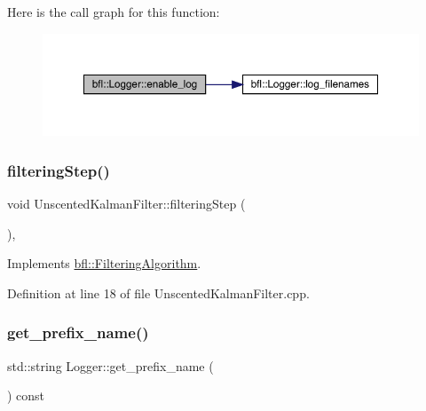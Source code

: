 Here is the call graph for this function\+:
\nopagebreak
\begin{figure}[H]
\begin{center}
\leavevmode
\includegraphics[width=350pt]{classbfl_1_1Logger_ae94b97b6e8d7902e8ce048384813122e_cgraph}
\end{center}
\end{figure}
\mbox{\label{classbfl_1_1UnscentedKalmanFilter_a169451bb711a03ad2dc28a40e3ad867f}} 
\subsubsection{\texorpdfstring{filtering\+Step()}{filteringStep()}}
{\footnotesize\ttfamily void Unscented\+Kalman\+Filter\+::filtering\+Step (\begin{DoxyParamCaption}{ }\end{DoxyParamCaption})\hspace{0.3cm}{\ttfamily [override]}, {\ttfamily [virtual]}}



Implements \mbox{\hyperlink{classbfl_1_1FilteringAlgorithm_ab3bceb43b5810a4bf1da884b8a0b145a}{bfl\+::\+Filtering\+Algorithm}}.



Definition at line 18 of file Unscented\+Kalman\+Filter.\+cpp.

\mbox{\label{classbfl_1_1Logger_a913a795b7bfbf378815eeb342d68a7c0}} 
\subsubsection{\texorpdfstring{get\+\_\+prefix\+\_\+name()}{get\_prefix\_name()}}
{\footnotesize\ttfamily std\+::string Logger\+::get\+\_\+prefix\+\_\+name (\begin{DoxyParamCaption}{ }\end{DoxyParamCaption}) const\hspace{0.3cm}{\ttfamily [inherited]}}




